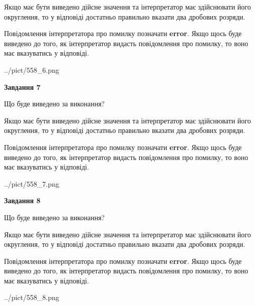 \documentclass[12pt, ukrainian]{article}
\begin{document}
{\begin {Large}
Якщо має бути виведено дійсне значення та інтерпретатор має здійснювати його округлення, 
то у відповіді достатньо правильно вказати два дробових розряди.

Повідомлення інтерпретатора про помилку позначати \textbf{error}.
Якщо щось буде виведено до того, як інтерпретатор видасть повідомлення про помилку, 
то воно має вказуватись у відповіді. \par

\begin{center}
	{../pict/558_6.png}
\end{center}
\newpage

{\begin {center}\textbf{Завдання 7}\end {center}}\par
Що буде виведено за виконання? \par

Якщо має бути виведено дійсне значення та інтерпретатор має здійснювати його округлення, 
то у відповіді достатньо правильно вказати два дробових розряди.

Повідомлення інтерпретатора про помилку позначати \textbf{error}.
Якщо щось буде виведено до того, як інтерпретатор видасть повідомлення про помилку, 
то воно має вказуватись у відповіді. \par

\begin{center}
	{../pict/558_7.png}
\end{center}
\newpage

{\begin {center}\textbf{Завдання 8}\end {center}}\par
Що буде виведено за виконання? \par

Якщо має бути виведено дійсне значення та інтерпретатор має здійснювати його округлення, 
то у відповіді достатньо правильно вказати два дробових розряди.

Повідомлення інтерпретатора про помилку позначати \textbf{error}.
Якщо щось буде виведено до того, як інтерпретатор видасть повідомлення про помилку, 
то воно має вказуватись у відповіді. \par

\begin{center}
	{../pict/558_8.png}
\end{center}
\newpage


\end{Large}}
\end{document}
